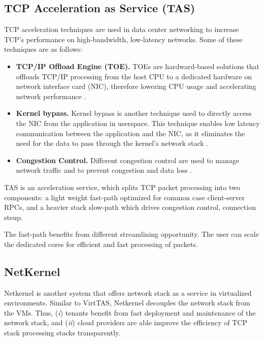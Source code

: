 \subsection{TCP Acceleration as Service (TAS)}
\label{tas}
TCP acceleration techniques are used in data center networking to increase TCP's performance
on high-bandwidth, low-latency networks. Some of these techniques are as follows:
\begin{itemize}
    \item \textbf{TCP/IP Offload Engine (TOE).} TOEs are hardward-based solutions that offloads
    TCP/IP processing from the host CPU to a dedicated hardware on network interface card 
    (NIC), therefore lowering CPU usage and accelerating network performance
    \cite{shashidhara2022flextoe,wu2006design,kant2003tcp,freimuth2005server}.
    \item \textbf{Kernel bypass.} Kernel bypass is another technique used to directly access 
    the NIC from the application in userspace. This technique enables low latency 
    communication between the application and the NIC, as it eliminates the need for 
    the data to pass through the kernel's network stack 
    \cite{chen2018survey, kaufmann2019tas, marty2019snap}. 
    \item \textbf{Congestion Control.} Different congestion control are used to manage
    network traffic and to prevent congestion and data loss \cite{mittal2015timely,kumar2020swift}. 
\end{itemize}

TAS is an acceleration service, which splits TCP packet processing 
into two components: a light weight fast-path optimized for common case client-server RPCs,
and a heavier stack slow-path which drives congestion control, connection steup. 

The fast-path benefits from different streamlining opportunity. The user can scale the 
dedicated cores for efficient and fast processing of packets.




\subsection{NetKernel}
\label{netkernel}
Netkernel is another system that offers network stack as a service in virtualized 
environments. Similar to VirtTAS, Netkernel decouples the network stack from the VMs. Thus, 
(\emph{i}) tenants benefit from fast deployment and maintenance of the network 
stack, and (\emph{ii}) cloud providers are able improve the efficiency of TCP stack processing stacks 
transparently. 

